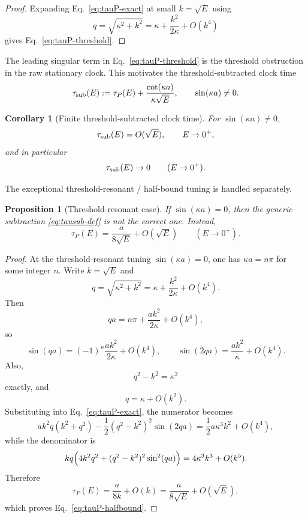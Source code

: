 \documentclass[aps,pra,preprint,notitlepage,nofootinbib]{revtex4-2}
\newtheorem{proposition}{Proposition}
\newtheorem{corollary}{Corollary}
\begin{document}
\begin{proof}
Expanding Eq.~\eqref{eq:tauP-exact} at small $k=\sqrt{E}$ using
\begin{equation}
q=\sqrt{\kappa^2+k^2}=\kappa+\frac{k^2}{2\kappa}+O(k^4)
\end{equation}
gives Eq.~\eqref{eq:tauP-threshold}.
\end{proof}

The leading singular term in Eq.~\eqref{eq:tauP-threshold} is the threshold obstruction in the raw stationary clock. This motivates the threshold-subtracted clock time
\begin{equation}
\tau_{\rm sub}(E):=
\tau_P(E)+\frac{\cot(\kappa a)}{\kappa\sqrt{E}},
\qquad \sin(\kappa a)\neq 0.
\label{eq:tausub-def}
\end{equation}

\begin{corollary}[Finite threshold-subtracted clock time]
For $\sin(\kappa a)\neq 0$,
\begin{equation}
\tau_{\rm sub}(E)=O(\sqrt{E}),
\qquad E\to0^+,
\end{equation}
and in particular
\begin{equation}
\tau_{\rm sub}(E)\to 0
\qquad (E\to0^+).
\label{eq:tausub-vanish}
\end{equation}
\end{corollary}

The exceptional threshold-resonant / half-bound tuning is handled separately.

\begin{proposition}[Threshold-resonant case]
If $\sin(\kappa a)=0$, then the generic subtraction \eqref{eq:tausub-def} is not the correct one. Instead,
\begin{equation}
\tau_P(E)=\frac{a}{8\sqrt{E}}+O(\sqrt{E})
\qquad (E\to 0^+).
\label{eq:tauP-halfbound}
\end{equation}
\end{proposition}

\begin{proof}
At the threshold-resonant tuning $\sin(\kappa a)=0$, one has $\kappa a=n\pi$ for some integer $n$. Write $k=\sqrt{E}$ and
\[
q=\sqrt{\kappa^2+k^2}
=\kappa+\frac{k^2}{2\kappa}+O(k^4).
\]
Then
\[
qa=n\pi+\frac{a k^2}{2\kappa}+O(k^4),
\]
so
\[
\sin(qa)=(-1)^n\frac{a k^2}{2\kappa}+O(k^4),
\qquad
\sin(2qa)=\frac{a k^2}{\kappa}+O(k^4).
\]
Also,
\[
q^2-k^2=\kappa^2
\]
exactly, and
\[
q=\kappa+O(k^2).
\]
Substituting into Eq.~\eqref{eq:tauP-exact}, the numerator becomes
\[
a k^2 q(k^2+q^2)-\frac12(q^2-k^2)^2\sin(2qa)
=
\frac12 a\kappa^3 k^2+O(k^4),
\]
while the denominator is
\[
kq\Bigl(4k^2q^2+(q^2-k^2)^2\sin^2(qa)\Bigr)
=
4\kappa^3 k^3+O(k^5).
\]
Therefore
\[
\tau_P(E)=\frac{a}{8k}+O(k)
=\frac{a}{8\sqrt{E}}+O(\sqrt{E}),
\]
which proves Eq.~\eqref{eq:tauP-halfbound}.
\end{proof}
\end{document}
